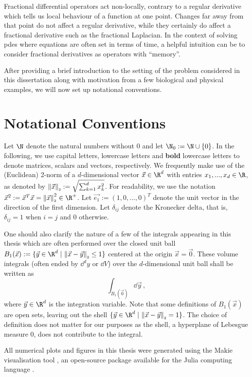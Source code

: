 Fractional differential operators act non-locally, contrary to a regular derivative which tells us local behaviour of a function at one point.
Changes far away from that point do not affect a regular derivative, while they certainly do affect a fractional derivative such as the fractional Laplacian.
In the context of solving \gls{pdes} where equations are often set in terms of time, a helpful intuition can be to consider fractional derivatives as operators with ``memory''.

After providing a brief introduction to the setting of the problem considered in this dissertation along with motivation from a few biological and physical examples, we will now set up notational conventions.

\section{Notational Conventions}
Let $\N$ denote the natural numbers without $0$ and let $\N_0 := \N \cup \{0\}$.
In the following, we use capital letters, lowercase letters and \textbf{bold} lowercase letters to denote matrices, scalars and vectors, respectively.
We frequently make use of the (Euclidean) 2-norm of a $d$-dimensional vector $\vec{x} \in \R^d$ with entries $x_1, ..., x_d \in \R$, as denoted by $\left\lVert\vec{x}\right\rVert_{\scriptscriptstyle 2} := \sqrt{\sum_{k=1}^d x_k^2}$.
For readability, we use the notation $\vec{x}^2 := \vec{x}^T \vec{x} = \norm{\vec{x}}^2 \in \R^+$.
Let $\vec{e_1} := (1, 0, ..., 0)^T$ denote the unit vector in the direction of the first dimension.
Let $\delta_{ij}$ denote the Kronecker delta, that is, $\delta_{ij} = 1$ when $i=j$ and $0$ otherwise.

One should also clarify the nature of a few of the integrals appearing in this thesis which are often performed over the closed unit ball $B_1(\vec{x}) := \{\vec{y} \in \R^d \;|\, \norm{\vec{x} - \vec{y}} \le 1\}$ centered at the origin $\vec{x} = \vec{0}$.
These volume integrals (often ended by $\dd^d y$ or $\dd V$) over the $d$-dimensional unit ball shall be written as
$$\int_{B_1(\vec{0})} \dd\vec{y}\,,$$
where $\vec{y} \in \R^d$ is the integration variable.
Note that some definitions of $B_1(\vec{x})$ are open sets, leaving out the shell $\{\vec{y} \in \R^d \;|\, \norm{\vec{x} - \vec{y}} = 1\}$.
The choice of definition does not matter for our purposes as the shell, a hyperplane of Lebesgue measure $0$, does not contribute to the integral.

All numerical plots and figures in this thesis were generated using the Makie visualisation tool \parencite{2021-makie}, an open-source package available for the Julia computing language \parencite{2017-julia}.
